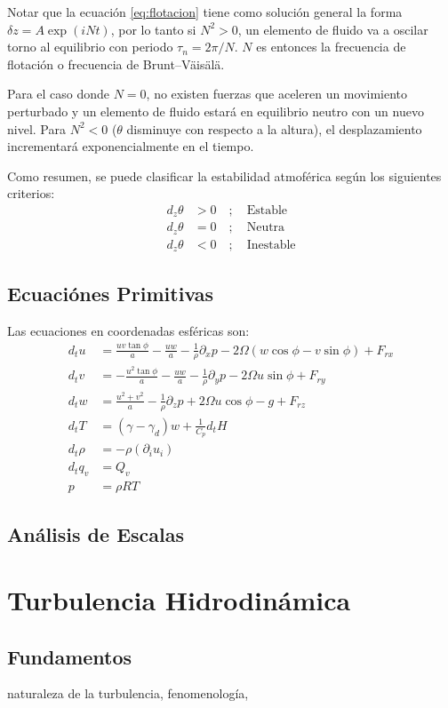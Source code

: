 Notar que la ecuación \ref{eq:flotacion} tiene como solución general la forma $\delta z = A \exp(iNt)$, por lo tanto si $N^2>0$, un elemento de fluido va a oscilar torno al equilibrio con periodo $\tau_n = 2\pi/N$. $N$ es entonces la frecuencia de flotación o frecuencia de Brunt–Väisälä. 

Para el caso donde $N=0$, no existen fuerzas que aceleren un movimiento perturbado y un elemento de fluido estará en equilibrio neutro con un nuevo nivel. Para $N^2<0$ ($\theta$ disminuye con respecto a la altura), el desplazamiento incrementará exponencialmente en el tiempo.

Como resumen, se puede clasificar la estabilidad atmoférica según los siguientes criterios:
\begin{align*}
d_z \theta &> 0\quad;\quad\text{Estable}\\
d_z \theta &= 0\quad;\quad\text{Neutra}\\
d_z \theta &< 0\quad;\quad\text{Inestable}
\end{align*}
\subsection{Ecuaciónes Primitivas}
Las ecuaciones en coordenadas esféricas son:
\begin{align}
d_t u &= \frac{uv\tan\phi}{a}-\frac{uw}{a}-\frac{1}{\rho}\partial_x p - 2\Omega(w\cos\phi - v\sin\phi) + F_{rx}\\
d_t v &= -\frac{u^2\tan\phi}{a}-\frac{uw}{a}-\frac{1}{\rho}\partial_y p - 2\Omega u\sin\phi + F_{ry}\\
d_t w &= \frac{u^2 + v^2}{a}-\frac{1}{\rho}\partial_z p + 2\Omega u\cos\phi -g + F_{rz}\\
d_t T &= (\gamma-\gamma_d)w+\frac{1}{C_p}d_t H\\
d_t \rho &= -\rho(\partial_i u_i)\\
d_t q_v &= Q_v\\
p &= \rho R T
\end{align}

\subsection{Análisis de Escalas}
\section{Turbulencia Hidrodinámica}
\subsection{Fundamentos}
naturaleza de la turbulencia, fenomenología, 

